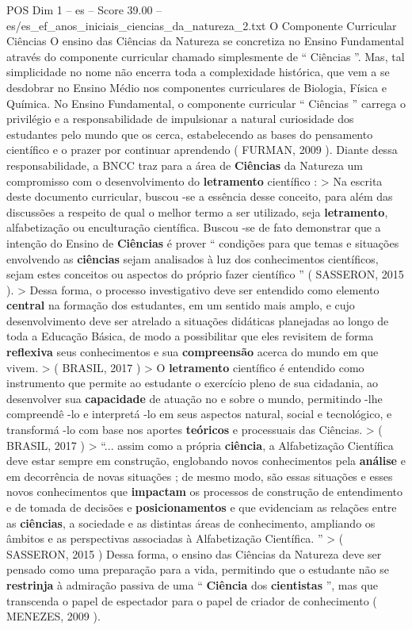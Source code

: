 \begin{textsample}{POS Dim 1 – es – Score 39.00 – es/es\_ef\_anos\_iniciais\_ciencias\_da\_natureza\_2.txt}  \label{ex:f1_pos_199}
O Componente Curricular Ciências O ensino das Ciências da Natureza se concretiza no Ensino Fundamental através do componente curricular chamado simplesmente de “ Ciências ”.
Mas, tal simplicidade no nome não encerra toda a complexidade histórica, que vem a se desdobrar no Ensino Médio nos componentes curriculares de Biologia, Física e Química.
No Ensino Fundamental, o componente curricular “ Ciências ” carrega o privilégio e a responsabilidade de impulsionar a natural curiosidade dos estudantes pelo mundo que os cerca, estabelecendo as bases do pensamento científico e o prazer por continuar aprendendo ( FURMAN, 2009 ).
Diante dessa responsabilidade, a BNCC traz para a área de \textbf{Ciências} da Natureza um compromisso com o desenvolvimento do \textbf{letramento} científico : > Na escrita deste documento curricular, buscou -se a essência desse conceito, para além das discussões a respeito de qual o melhor termo a ser utilizado, seja \textbf{letramento}, alfabetização ou enculturação científica.
Buscou -se de fato demonstrar que a intenção do Ensino de \textbf{Ciências} é prover “ condições para que temas e situações envolvendo as \textbf{ciências} sejam analisados à luz dos conhecimentos científicos, sejam estes conceitos ou aspectos do próprio fazer científico ” ( SASSERON, 2015 ). > Dessa forma, o processo investigativo deve ser entendido como elemento \textbf{central} na formação dos estudantes, em um sentido mais amplo, e cujo desenvolvimento deve ser atrelado a situações didáticas planejadas ao longo de toda a Educação Básica, de modo a possibilitar que eles revisitem de forma \textbf{reflexiva} seus conhecimentos e sua \textbf{compreensão} acerca do mundo em que vivem. > ( BRASIL, 2017 ) > O \textbf{letramento} científico é entendido como instrumento que permite ao estudante o exercício pleno de sua cidadania, ao desenvolver sua \textbf{capacidade} de atuação no e sobre o mundo, permitindo -lhe compreendê -lo e interpretá -lo em seus aspectos natural, social e tecnológico, e transformá -lo com base nos aportes \textbf{teóricos} e processuais das Ciências. > ( BRASIL, 2017 ) > “... assim como a própria \textbf{ciência}, a Alfabetização Científica deve estar sempre em construção, englobando novos conhecimentos pela \textbf{análise} e em decorrência de novas situações ; de mesmo modo, são essas situações e esses novos conhecimentos que \textbf{impactam} os processos de construção de entendimento e de tomada de decisões e \textbf{posicionamentos} e que evidenciam as relações entre as \textbf{ciências}, a sociedade e as distintas áreas de conhecimento, ampliando os âmbitos e as perspectivas associadas à Alfabetização Científica. ” > ( SASSERON, 2015 ) Dessa forma, o ensino das Ciências da Natureza deve ser pensado como uma preparação para a vida, permitindo que o estudante não se \textbf{restrinja} à admiração passiva de uma “ \textbf{Ciência} dos \textbf{cientistas} ”, mas que transcenda o papel de espectador para o papel de criador de conhecimento ( MENEZES, 2009 ).

\end{textsample}
